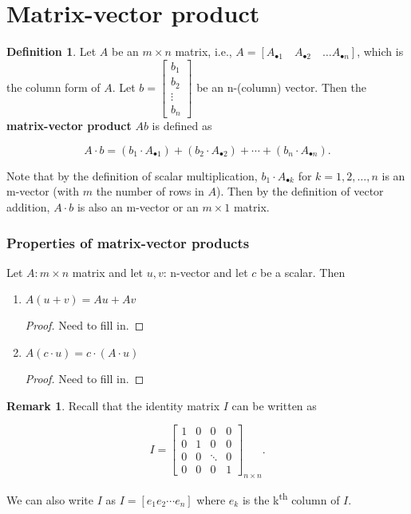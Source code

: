 \documentclass[12pt]{article}
\theoremstyle{definition}
\newtheorem*{definition}{Definition}
\newtheorem*{remark}{Remark}
\begin{document}
\section{Matrix-vector product}

\begin{definition}
Let $A$ be an $m \times n$ matrix, i.e., 
$A = [A_{\bullet 1} \quad A_{\bullet 2} \quad \ldots A_{\bullet n}]$, which is 
the column form of $A$. Let $b = \begin{bmatrix} b_1 \\ b_2 \\ \vdots \\ b_n \end{bmatrix}$
be an n-(column) vector. Then the \textbf{matrix-vector product} $Ab$ is defined as

\[
A \cdot b = (b_1 \cdot A_{\bullet 1}) + (b_2 \cdot A_{\bullet 2}) + \cdots + (b_n \cdot A_{\bullet n}).
\]

Note that by the definition of scalar multiplication, $b_1 \cdot A_{\bullet k}$ for 
$k = 1, 2, \ldots, n$ is an m-vector (with $m$ the number of rows in $A$). Then by the definition
of vector addition, $A \cdot b$ is also an m-vector or an $m \times 1$ matrix.
\end{definition}

\subsubsection{Properties of matrix-vector products}

Let $A: m \times n$ matrix and let $u, v$: n-vector and let $c$ be a scalar. Then

\begin{enumerate}
\item $A(u + v) = Au + Av$
\begin{proof}
Need to fill in.
\end{proof}

\item $A(c \cdot u) = c \cdot (A \cdot u)$
\begin{proof}
Need to fill in.
\end{proof}
\end{enumerate}

\begin{remark}
Recall that the identity matrix $I$ can be written as

\[
I =
\begin{bmatrix}
1 & 0 & 0 & 0\\
0 & 1 & 0 & 0\\
0 & 0 & \ddots & 0 \\
0& 0 & 0 & 1
\end{bmatrix}_{n \times n}.
\]

We can also write $I$ as $I = [e_1 e_2 \cdots e_n]$ where $e_k$ is the k\textsuperscript{th}
column of $I$.
\end{remark}
\end{document}
